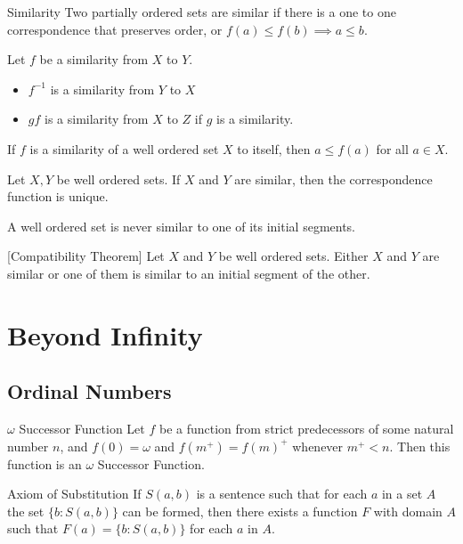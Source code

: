 \documentclass[a4paper]{article}
\begin{document}
\begin{defn}{Similarity}{} Two partially ordered sets are similar if there is a one to one correspondence that preserves order, or $f(a)\leq f(b)\implies a\leq b$. 
\end{defn}

\begin{prp}{}{} Let $f$ be a similarity from $X$ to $Y$. 
\begin{itemize}
\item $f^{-1}$ is a similarity from $Y$ to $X$
\item $gf$ is a similarity from $X$ to $Z$ if $g$ is a similarity. 
\end{itemize}
\end{prp}

\begin{thm}{}{} If $f$ is a similarity of a well ordered set $X$ to itself, then $a\leq f(a)$ for all $a\in X$. 
\end{thm}

\begin{thm}{}{} Let $X,Y$ be well ordered sets. If $X$ and $Y$ are similar, then the correspondence function is unique. 
\end{thm}

\begin{thm}{}{} A well ordered set is never similar to one of its initial segments. 
\end{thm}

\begin{thm}{}{}[Compatibility Theorem] Let $X$ and $Y$ be well ordered sets. Either $X$ and $Y$ are similar or one of them is similar to an initial segment of the other. 
\end{thm}

\pagebreak
\section{Beyond Infinity}
\subsection{Ordinal Numbers}
\begin{defn}{$\omega$ Successor Function}{} Let $f$ be a function from strict predecessors of some natural number $n$, and $f(0)=\omega$ and $f(m^+)=f(m)^+$ whenever $m^+<n$. Then this function is an $\omega$ Successor Function. 
\end{defn}

\begin{axm}{Axiom of Substitution}{} If $S(a,b)$ is a sentence such that for each $a$ in a set $A$ the set $\{b:S(a,b)\}$ can be formed, then there exists a function $F$ with domain $A$ such that $F(a)=\{b:S(a,b)\}$ for each $a$ in $A$. 
\end{axm}
\end{document}
